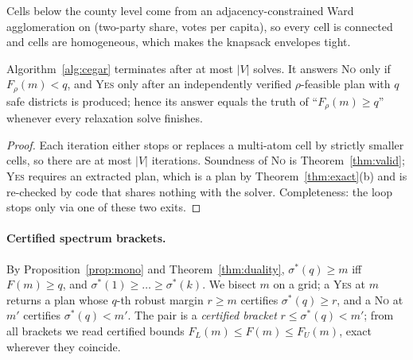 Cells below the county level come from an adjacency-constrained Ward agglomeration on (two-party share, votes per capita), so every cell is connected and cells are homogeneous, which makes the knapsack envelopes tight.

\begin{theorem}\label{thm:cegar}
Algorithm~\ref{alg:cegar} terminates after at most $|V|$ solves. It answers \textsc{No} only if $F_\rho(m)<q$, and \textsc{Yes} only after an independently verified $\rho$-feasible plan with $q$ safe districts is produced; hence its answer equals the truth of ``$F_\rho(m)\ge q$'' whenever every relaxation solve finishes.
\end{theorem}
\begin{proof}
Each iteration either stops or replaces a multi-atom cell by strictly smaller cells, so there are at most $|V|$ iterations. Soundness of \textsc{No} is Theorem~\ref{thm:valid}; \textsc{Yes} requires an extracted plan, which is a plan by Theorem~\ref{thm:exact}(b) and is re-checked by code that shares nothing with the solver. Completeness: the loop stops only via one of these two exits.
\end{proof}

\paragraph{Certified spectrum brackets.}
By Proposition~\ref{prop:mono} and Theorem~\ref{thm:duality}, $\sigma^*(q)\ge m$ iff $F(m)\ge q$, and $\sigma^*(1)\ge\dots\ge\sigma^*(k)$. We bisect $m$ on a grid; a \textsc{Yes} at $m$ returns a plan whose $q$-th robust margin $r\ge m$ certifies $\sigma^*(q)\ge r$, and a \textsc{No} at $m'$ certifies $\sigma^*(q)<m'$. The pair is a \emph{certified bracket} $r\le\sigma^*(q)<m'$; from all brackets we read certified bounds $F_L(m)\le F(m)\le F_U(m)$, exact wherever they coincide.

